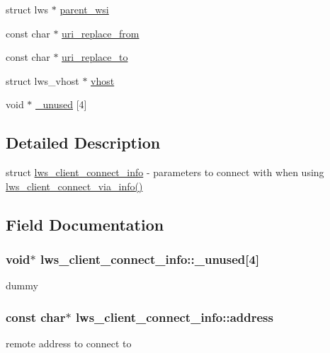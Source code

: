 \begin{DoxyCompactItemize}
\item 
struct lws $\ast$ \hyperlink{structlws__client__connect__info_a6843a60e1050b10db9d98d7eeb45f587}{parent\+\_\+wsi}
\item 
const char $\ast$ \hyperlink{structlws__client__connect__info_a03c305fdca809667b6a9a83b3edfd83a}{uri\+\_\+replace\+\_\+from}
\item 
const char $\ast$ \hyperlink{structlws__client__connect__info_a9959ba103d3d2484e559a9f7879eebe3}{uri\+\_\+replace\+\_\+to}
\item 
struct lws\+\_\+vhost $\ast$ \hyperlink{structlws__client__connect__info_a3893181d728f326f9f5b47c1459cb8be}{vhost}
\item 
void $\ast$ \hyperlink{structlws__client__connect__info_ad47f50d1633dc5df74548606c9a66d73}{\+\_\+unused} \mbox{[}4\mbox{]}
\end{DoxyCompactItemize}


\subsection{Detailed Description}
struct \hyperlink{structlws__client__connect__info}{lws\+\_\+client\+\_\+connect\+\_\+info} -\/ parameters to connect with when using \hyperlink{group__client_gac30a7be106abd0cedfbb2e8b8fe3a2f5}{lws\+\_\+client\+\_\+connect\+\_\+via\+\_\+info()} 

\subsection{Field Documentation}
\subsubsection[{\texorpdfstring{\+\_\+unused}{\_unused}}]{\setlength{\rightskip}{0pt plus 5cm}void$\ast$ lws\+\_\+client\+\_\+connect\+\_\+info\+::\+\_\+unused\mbox{[}4\mbox{]}}\hypertarget{structlws__client__connect__info_ad47f50d1633dc5df74548606c9a66d73}{}\label{structlws__client__connect__info_ad47f50d1633dc5df74548606c9a66d73}
dummy 
\subsubsection[{\texorpdfstring{address}{address}}]{\setlength{\rightskip}{0pt plus 5cm}const char$\ast$ lws\+\_\+client\+\_\+connect\+\_\+info\+::address}\hypertarget{structlws__client__connect__info_aa364094f94ef1bcaaabbd9161971d502}{}\label{structlws__client__connect__info_aa364094f94ef1bcaaabbd9161971d502}
remote address to connect to 
